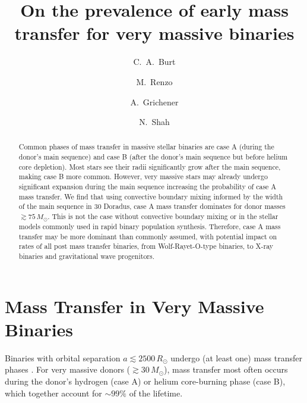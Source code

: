 \documentclass[twocolumn]{aastex631}
\begin{document}
\title{On the prevalence of early mass transfer for very massive binaries}

\author[0009-0008-2061-4946]{C.~A.~Burt}

\author[0000-0002-6718-9472]{M.~Renzo}

\author[0000-0002-2215-1841]{A.~Grichener}

\author[0000-0002-8465-8090]{N.~Shah}




\begin{abstract}
  Common phases of mass transfer in massive stellar binaries are case
  A (during the donor's main sequence) and case B (after the donor's
  main sequence but before helium core depletion). Most stars see
  their radii significantly grow after the main sequence, making case
  B more common. However, very massive stars may already undergo
  significant expansion during the main sequence increasing the
  probability of case A mass transfer. We find that using convective
  boundary mixing informed by the width of the main sequence in 30
  Doradus, case A mass transfer dominates for donor masses
  $\gtrsim 75 \, M_{\odot}$. This is not the case without convective
  boundary mixing or in the stellar models commonly used in rapid
  binary population synthesis. Therefore, case A mass transfer may be
  more dominant than commonly assumed, with potential impact on rates
  of all post mass transfer binaries, from Wolf-Rayet-O-type binaries,
  to X-ray binaries and gravitational wave progenitors.
\end{abstract}

\section{Mass Transfer in Very Massive Binaries}

Binaries with orbital separation $a\lesssim2500\,R_{\odot}$ undergo
(at least one) mass transfer phases \citep{sana:12}. For very massive
donors ($ \gtrsim 30 \, M_{\odot}$), mass transfer most often occurs
during the donor's hydrogen (case A) or helium core-burning phase
(case B), which together account for $\sim99\%$ of the lifetime.
\end{document}
